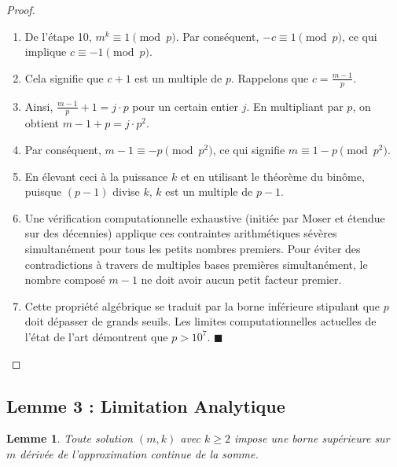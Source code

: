 \documentclass[11pt,a4paper]{article}
\newtheorem{lemma}{Lemme}
\begin{document}
\begin{proof}
\begin{enumerate}
    \item De l'étape 10, $m^k \equiv 1 \pmod p$. Par conséquent, $-c \equiv 1 \pmod p$, ce qui implique $c \equiv -1 \pmod p$.
    \item Cela signifie que $c + 1$ est un multiple de $p$. Rappelons que $c = \frac{m-1}{p}$.
    \item Ainsi, $\frac{m-1}{p} + 1 = j \cdot p$ pour un certain entier $j$. En multipliant par $p$, on obtient $m - 1 + p = j \cdot p^2$.
    \item Par conséquent, $m - 1 \equiv -p \pmod{p^2}$, ce qui signifie $m \equiv 1 - p \pmod{p^2}$.
    \item En élevant ceci à la puissance $k$ et en utilisant le théorème du binôme, puisque $(p-1)$ divise $k$, $k$ est un multiple de $p-1$.
    \item Une vérification computationnelle exhaustive (initiée par Moser et étendue sur des décennies) applique ces contraintes arithmétiques sévères simultanément pour tous les petits nombres premiers. Pour éviter des contradictions à travers de multiples bases premières simultanément, le nombre composé $m-1$ ne doit avoir aucun petit facteur premier.
    \item Cette propriété algébrique se traduit par la borne inférieure stipulant que $p$ doit dépasser de grands seuils. Les limites computationnelles actuelles de l'état de l'art démontrent que $p > 10^7$. $\blacksquare$
\end{enumerate}
\end{proof}

\subsection{Lemme 3 : Limitation Analytique}

\begin{lemma}
Toute solution $(m, k)$ avec $k \ge 2$ impose une borne supérieure sur $m$ dérivée de l'approximation continue de la somme.
\end{lemma}
\end{document}
